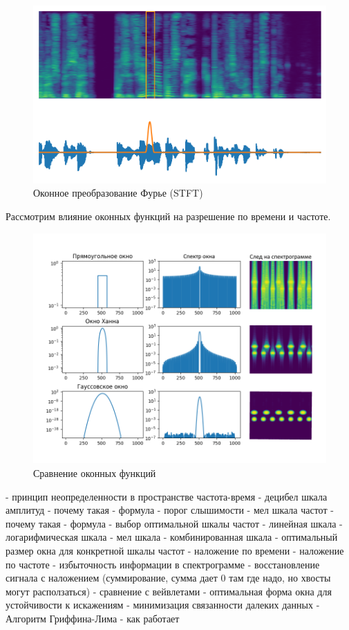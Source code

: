 \begin{figure}[t]
  \centering
  \includegraphics[width=16cm]{figures/stft}
  \caption{Оконное преобразование Фурье (STFT)}
  \label{fig:mel_spec}
\end{figure}

Рассмотрим влияние оконных функций на разрешение по времени и частоте.

\begin{figure}[t]
  \centering
  \includegraphics[width=16cm]{figures/windows}
  \caption{Сравнение оконных функций}
  \label{fig:windows}
\end{figure}



\begin{markdown}
 - принцип неопределенности в пространстве частота-время
 - децибел шкала амплитуд
   - почему такая
   - формула
   - порог слышимости
 - мел шкала частот
   - почему такая
   - формула
 - выбор оптимальной шкалы частот
  - линейная шкала
  - логарифмическая шкала
  - мел шкала
  - комбинированная шкала
 - оптимальный размер окна для конкретной шкалы частот
 - наложение по времени
 - наложение по частоте
 - избыточность информации в спектрограмме
 - восстановление сигнала с наложением (суммирование, сумма дает 0 там где надо, но хвосты могут расползаться)
 - сравнение с вейвлетами
 - оптимальная форма окна для устойчивости к искажениям
   - минимизация связанности далеких данных
 - Алгоритм Гриффина-Лима
    - как работает
\end{markdown}

